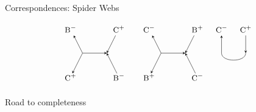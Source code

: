 \documentclass{beamer}
\begin{document}
\begin{frame}{Correspondences: Spider Webs}
\begin{figure}[h!]
\[\begin{tikzpicture}
			\node (i32) at (3.75,-5) {$\textsc{\small B}^-$};
			\node (ii32) at (5.75,-5) {$\textsc{\small C}^+$};
			\node (d32) at (4.25,-6) {};
			\node (dd32) at (5.25,-6) {};
			\node (o32) at (3.75,-7) {$\textsc{\small C}^+$};
			\node (oo32) at (5.75,-7) {$\textsc{\small B}^-$};
			\draw[<-,>=stealth] (i32) -- (d32.center);
			\draw[->,>=stealth] (ii32) -- (dd32.center);
			\draw[->,>=stealth] (d32.center) -- (dd32.center);
			\draw[->,>=stealth, shorten >=5pt] (d32.center) -- (o32.center);
			\draw[<-,>=stealth, shorten >=5pt] (dd32.center) -- (oo32.center);
			
			\node (i33) at (7,-5) {$\textsc{\small C}^-$};
			\node (ii33) at (9,-5) {$\textsc{\small B}^+$};
			\node (d33) at (7.5,-6) {};
			\node (dd33) at (8.5,-6) {};
			\node (o33) at (7,-7) {$\textsc{\small B}^+$};
			\node (oo33) at (9,-7) {$\textsc{\small C}^-$};
			\draw[<-,>=stealth] (i33) -- (d33.center);
			\draw[->,>=stealth] (ii33) -- (dd33.center);
			\draw[->,>=stealth] (d33.center) -- (dd33.center);
			\draw[->,>=stealth, shorten >=5pt] (d33.center) -- (o33.center);
			\draw[<-,>=stealth, shorten >=5pt] (dd33.center) -- (oo33.center);
			
			\node (i34) at (10,-5) {$\textsc{\small C}^-$};
			\node (ii34) at (11,-5) {$\textsc{\small C}^+$};
			\node (d34) at (10,-6) {};
			\node (dd34) at (11,-6) {};
			\draw[<-,>=stealth] (i34) -- (d34.center);
			\draw[->,>=stealth] (ii34) -- (dd34.center);
			\draw (d34.center) edge [-,>=stealth,bend right=90] (dd34.center);
			
			\end{tikzpicture}
			\]
			\end{figure}
	\end{frame}
	\begin{frame}{Road to completeness}
		 	
	\end{frame}
  	
\end{document}
